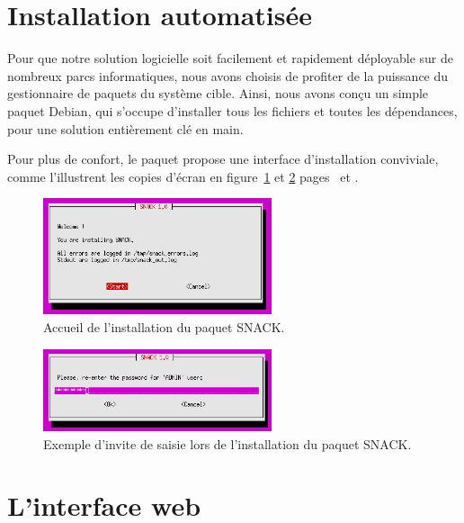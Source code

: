 \section{Installation automatisée}

Pour que notre solution logicielle soit facilement et rapidement déployable sur de nombreux parcs informatiques, nous avons choisis de profiter de la puissance du gestionnaire de paquets du système cible. Ainsi, nous avons conçu un simple paquet Debian, qui s'occupe d'installer tous les fichiers et toutes les dépendances, pour une solution entièrement clé en main.

Pour plus de confort, le paquet propose une interface d'installation conviviale, comme l'illustrent les copies d'écran en figure~\ref{install_start} et \ref{install_prompt} pages~\pageref{install_start} et \pageref{install_prompt}.

\begin{figure}[!h]
	\begin{center}
	    \includegraphics[width=0.6\textwidth]{img/install_start.png}
	\end{center}
	\caption{Accueil de l'installation du paquet SNACK.}
	\label{install_start}
\end{figure}

\begin{figure}[!h]
	\begin{center}
	    \includegraphics[width=0.6\textwidth]{img/install_prompt.png}
	\end{center}
	\caption{Exemple d'invite de saisie lors de l'installation du paquet SNACK.}
	\label{install_prompt}
\end{figure}

\section{L'interface web}
